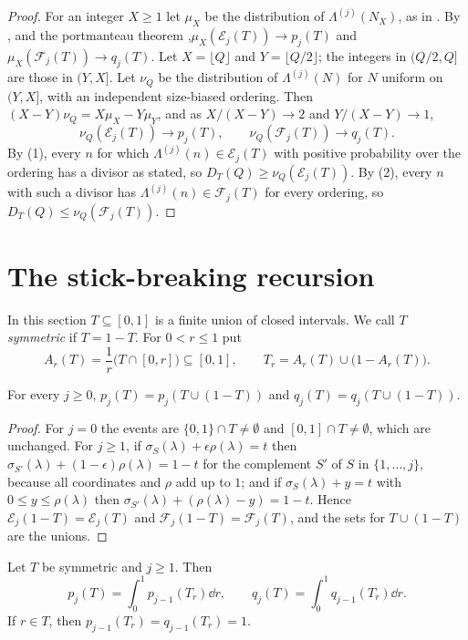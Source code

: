 \documentclass[11pt,colorlinks]{charlie}
\newcommand{\cE}{\mathcal{E}}
\newcommand{\cF}{\mathcal{F}}
\begin{document}
\begin{proof}
For an integer $X\ge1$ let $\mu_X$ be the distribution of $\Lambda^{(j)}(N_X)$, as in . By ,  and the portmanteau theorem \cite[Thm.~2.1]{Billingsley},\linebreak[1] $\mu_X(\cE_j(T))\to p_j(T)$ and $\mu_X(\cF_j(T))\to q_j(T)$. Let $X=\lfloor Q\rfloor$ and $Y=\lfloor Q/2\rfloor$; the integers in $(Q/2,Q]$ are those in $(Y,X]$. Let $\nu_Q$ be the distribution of $\Lambda^{(j)}(N)$ for $N$ uniform on $(Y,X]$, with an independent size-biased ordering. Then $(X-Y)\nu_Q=X\mu_X-Y\mu_Y$, and as $X/(X-Y)\to2$ and $Y/(X-Y)\to1$,
\[
 \nu_Q(\cE_j(T))\to p_j(T),\qquad\nu_Q(\cF_j(T))\to q_j(T).
\]
By (1), every $n$ for which $\Lambda^{(j)}(n)\in\cE_j(T)$ with positive probability over the ordering has a divisor as stated, so $D_T(Q)\ge\nu_Q(\cE_j(T))$. By (2), every $n$ with such a divisor has $\Lambda^{(j)}(n)\in\cF_j(T)$ for every ordering, so $D_T(Q)\le\nu_Q(\cF_j(T))$.
\end{proof}

\section{The stick-breaking recursion}\label{sec:stick}
In this section $T\subseteq[0,1]$ is a finite union of closed intervals. We call $T$ \emph{symmetric} if $T=1-T$. For $0<r\le1$ put
\[
 A_r(T)=\frac1r\big(T\cap[0,r]\big)\subseteq[0,1],\qquad T_r=A_r(T)\cup\big(1-A_r(T)\big).
\]

\begin{lemma}[Complements]\label{lem:complement}
For every $j\ge0$, $p_j(T)=p_j(T\cup(1-T))$ and $q_j(T)=q_j(T\cup(1-T))$.
\end{lemma}

\begin{proof}
For $j=0$ the events are $\{0,1\}\cap T\ne\emptyset$ and $[0,1]\cap T\ne\emptyset$, which are unchanged. For $j\ge1$, if $\sigma_S(\lambda)+\epsilon\rho(\lambda)=t$ then $\sigma_{S'}(\lambda)+(1-\epsilon)\rho(\lambda)=1-t$ for the complement $S'$ of $S$ in $\{1,\dots,j\}$, because all coordinates and $\rho$ add up to $1$; and if $\sigma_S(\lambda)+y=t$ with $0\le y\le\rho(\lambda)$ then $\sigma_{S'}(\lambda)+(\rho(\lambda)-y)=1-t$. Hence $\cE_j(1-T)=\cE_j(T)$ and $\cF_j(1-T)=\cF_j(T)$, and the sets for $T\cup(1-T)$ are the unions.
\end{proof}

\begin{lemma}[Recursion]\label{lem:recursion}
Let $T$ be symmetric and $j\ge1$. Then
\[
 p_j(T)=\int_0^1p_{j-1}(T_r)\dd r,\qquad q_j(T)=\int_0^1q_{j-1}(T_r)\dd r.
\]
If $r\in T$, then $p_{j-1}(T_r)=q_{j-1}(T_r)=1$.
\end{lemma}
\end{document}
